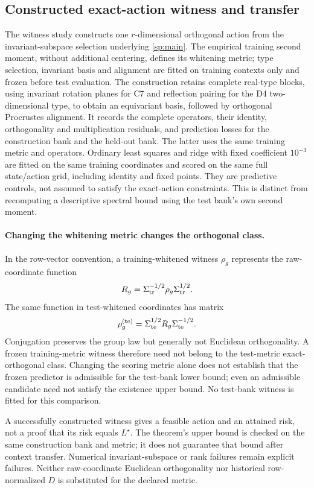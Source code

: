 \subsection{Constructed exact-action witness and transfer}
The witness study constructs one $r$-dimensional orthogonal action from the invariant-subspace selection underlying \cref{sp:main}. The empirical training second moment, without additional centering, defines its whitening metric; type selection, invariant basis and alignment are fitted on training contexts only and frozen before test evaluation. The construction retains complete real-type blocks, using invariant rotation planes for C7 and reflection pairing for the D4 two-dimensional type, to obtain an equivariant basis, followed by orthogonal Procrustes alignment. It records the complete operators, their identity, orthogonality and multiplication residuals, and prediction losses for the construction bank and the held-out bank. The latter uses the same training metric and operators. Ordinary least squares and ridge with fixed coefficient $10^{-3}$ are fitted on the same training coordinates and scored on the same full state/action grid, including identity and fixed points. They are predictive controls, not assumed to satisfy the exact-action constraints. This is distinct from recomputing a descriptive spectral bound using the test bank's own second moment.

\paragraph{Changing the whitening metric changes the orthogonal class.}
\label{app:metric-conjugation}
In the row-vector convention, a training-whitened witness $\rho_g$ represents the raw-coordinate function
\[
 R_g=\Sigma_{\rm tr}^{-1/2}\rho_g\Sigma_{\rm tr}^{1/2}.
\]
The same function in test-whitened coordinates has matrix
\[
 \rho_g^{(\rm te)}=\Sigma_{\rm te}^{1/2}R_g\Sigma_{\rm te}^{-1/2}.
\]
Conjugation preserves the group law but generally not Euclidean orthogonality. A frozen training-metric witness therefore need not belong to the test-metric exact-orthogonal class. Changing the scoring metric alone does not establish that the frozen predictor is admissible for the test-bank lower bound; even an admissible candidate need not satisfy the existence upper bound. No test-bank witness is fitted for this comparison.

A successfully constructed witness gives a feasible action and an attained risk, not a proof that its risk equals $L^\star$. The theorem's upper bound is checked on the same construction bank and metric; it does not guarantee that bound after context transfer. Numerical invariant-subspace or rank failures remain explicit failures. Neither raw-coordinate Euclidean orthogonality nor historical row-normalized $D$ is substituted for the declared metric.

